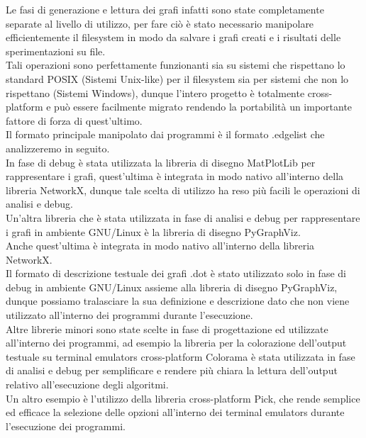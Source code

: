 Le fasi di generazione e lettura dei grafi infatti sono state completamente separate al livello di utilizzo, per fare ciò è stato necessario manipolare efficientemente il filesystem in modo da salvare i grafi creati e i risultati delle sperimentazioni su file.\\

Tali operazioni sono perfettamente funzionanti sia su sistemi che rispettano lo standard POSIX (Sistemi Unix-like) per il filesystem sia per sistemi che non lo rispettano (Sistemi Windows), dunque l'intero progetto è totalmente cross-platform e può essere facilmente migrato rendendo la portabilità un importante fattore di forza di quest'ultimo.\\

Il formato principale manipolato dai programmi è il formato .edgelist che analizzeremo in seguito.\\

In fase di debug è stata utilizzata la libreria di disegno MatPlotLib per rappresentare i grafi, quest'ultima è integrata in modo nativo all'interno della libreria NetworkX, dunque tale scelta di utilizzo ha reso più facili le operazioni di analisi e debug.\\

Un'altra libreria che è stata utilizzata in fase di analisi e debug per rappresentare i grafi in ambiente GNU/Linux è la libreria di disegno PyGraphViz.\\
Anche quest'ultima è integrata in modo nativo all'interno della libreria NetworkX.\\

Il formato di descrizione testuale dei grafi .dot è stato utilizzato solo in fase di debug in ambiente GNU/Linux assieme alla libreria di disegno PyGraphViz, dunque possiamo tralasciare la sua definizione e descrizione dato che non viene utilizzato all'interno dei programmi durante l'esecuzione.\\

Altre librerie minori sono state scelte in fase di progettazione ed utilizzate all'interno dei programmi, ad esempio la libreria per la colorazione dell'output testuale su terminal emulators cross-platform Colorama è stata utilizzata in fase di analisi e debug per semplificare e rendere più chiara la lettura dell'output relativo all'esecuzione degli algoritmi.\\

Un altro esempio è l'utilizzo della libreria cross-platform Pick, che rende semplice ed efficace la selezione delle opzioni all'interno dei terminal emulators durante l'esecuzione dei programmi.\\

